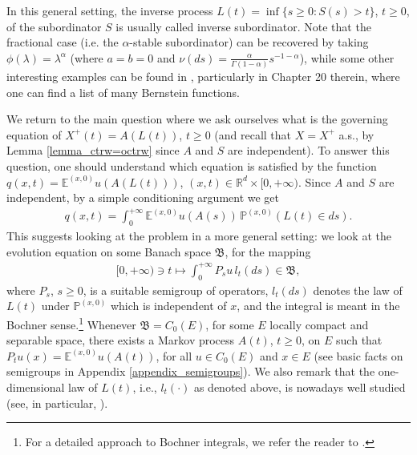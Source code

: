 \documentclass[reqno]{amsart}
\theoremstyle{remark}
\numberwithin{equation}{section} %
\newcommand{\RR}{\mathbb{R}}
\newcommand{\1}{\mathds{1}}
\begin{document}
	In this general setting, the inverse process $L(t)=\inf\{s\ge0:S(s)>t\}$, $t \geq 0$, of the subordinator $S$ is usually called inverse subordinator. Note that the fractional case (i.e. the $\alpha$-stable subordinator) can be recovered by taking $\phi(\lambda) = \lambda^\alpha$ (where $a=b=0$ and $\nu(ds)=\frac{\alpha}{\Gamma (1-\alpha)}s^{-1-\alpha}$), while some other interesting examples can be found in \cite{bernstein}, particularly in Chapter 20 therein, where one can find a list of many Bernstein functions.
	
	We return to the main question where we ask ourselves what is the governing equation of $X^+(t)=A(L(t))$, $t \geq 0$ (and recall that $X=X^+$ a.s., by Lemma \ref{lemma_ctrw=octrw} since $A$ and $S$ are independent). To answer this question, one should understand which equation is satisfied by the function $q(x,t) = \mathds{E}^{(x,0)}u(A(L(t)))$, $(x,t)\in\RR^{d}\times [0,+\infty)$. Since $A$ and $S$ are independent, by a simple conditioning argument we get 
	\begin{align}
		q(x,t) = \int_0^{+\infty} \mathds{E}^{(x,0)}u(A(s)) \, \mathds{P}^{(x,0)} (L(t) \in ds).
	\end{align}
	This suggests looking at the problem in a more general setting: we look at the evolution equation on some Banach space $\mathfrak{B}$, for the mapping
	\begin{align}
		[0, +\infty) \ni  t \mapsto \int_0^{+\infty} P_s u \, l_t(ds) \in \mathfrak{B},
	\end{align}
	where $P_s$, $s \geq 0$, is a suitable semigroup of operators, $l_t(ds)$ denotes the law of $L(t)$ under $\mathds{P}^{(x,0)}$ which is independent of $x$, and the integral is meant in the Bochner sense.\footnote{For a detailed approach to Bochner integrals, we refer the reader to \cite{Bochner}.} Whenever $\mathfrak{B} = C_0(E)$, for some $E$ locally compact and separable space, there exists a Markov process $A(t)$, $t\ge0$, on $E$ such that $P_tu(x) = \mathds{E}^{(x,0)}u(A(t))$, for all $u\in C_0(E)$ and $x \in E$ (see basic facts on semigroups in {Appendix} \ref{appendix_semigroups}). We also remark that the one-dimensional law of $L(t)$, i.e., $l_t(\cdot)$ as denoted above, is nowadays well studied (see, in particular, \cite{ascione2024regularity, rivero_doney}).
	
\end{document}
